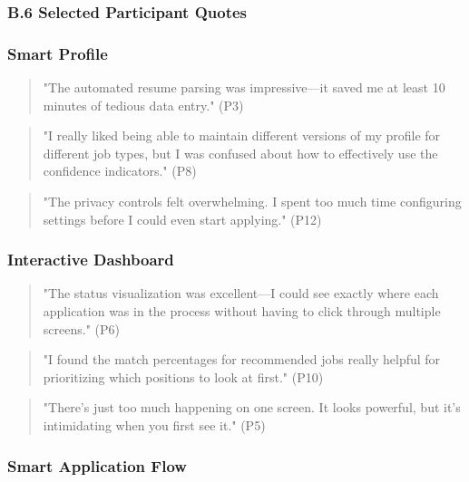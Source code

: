 \documentclass[
	letterpaper, %
]{jdf}
\begin{document}
\begin{sloppypar}
\subsubsection{B.6 Selected Participant Quotes}

\subsubsection{Smart Profile}

\begin{quote}
"The automated resume parsing was impressive—it saved me at least 10 minutes of tedious data entry." (P3)
\end{quote}

\begin{quote}
"I really liked being able to maintain different versions of my profile for different job types, but I was confused about how to effectively use the confidence indicators." (P8)
\end{quote}

\begin{quote}
"The privacy controls felt overwhelming. I spent too much time configuring settings before I could even start applying." (P12)
\end{quote}

\subsubsection{Interactive Dashboard}

\begin{quote}
"The status visualization was excellent—I could see exactly where each application was in the process without having to click through multiple screens." (P6)
\end{quote}

\begin{quote}
"I found the match percentages for recommended jobs really helpful for prioritizing which positions to look at first." (P10)
\end{quote}

\begin{quote}
"There's just too much happening on one screen. It looks powerful, but it's intimidating when you first see it." (P5)
\end{quote}

\subsubsection{Smart Application Flow}


\end{sloppypar}
\end{document}
